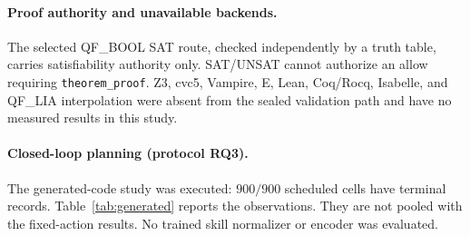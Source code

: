 \paragraph{Proof authority and unavailable backends.}
The selected QF\_BOOL SAT route, checked independently by a truth table, carries satisfiability authority only. SAT/UNSAT cannot authorize an allow requiring \texttt{theorem\_proof}. Z3, cvc5, Vampire, E, Lean, Coq/Rocq, Isabelle, and QF\_LIA interpolation were absent from the sealed validation path and have no measured results in this study.

\paragraph{Closed-loop planning (protocol RQ3).}
The generated-code study was executed: $900/900$ scheduled cells have terminal records. Table~\ref{tab:generated} reports the observations. They are not pooled with the fixed-action results. No trained skill normalizer or encoder was evaluated.
